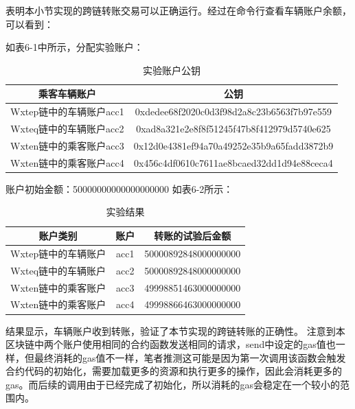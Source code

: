 表明本小节实现的跨链转账交易可以正确运行。经过在命令行查看车辆账户余额，可以看到：

如表6-1中所示，分配实验账户：

\begin{table}[H]
    \linespread{1.5}
    \centering
    \caption{实验账户公钥}\label{实验账户公钥}
    \begin{tabular}{cc} \toprule
        乘客车辆账户                  & 公钥                         \\ \hline
        Wxtep链中的车辆账户acc1 & 0xdedee68f2020c0d3f98d2a8c23b6563f7b97e559            \\
        Wxteq链中的车辆账户acc2   & 0xad8a321e2e8f8f51245f47b8f412979d5740e625            \\
        Wxten链中的乘客账户acc3   & 0x12d0e4381ef94a70a49252e35b9a65fadd3872b9 
        \\
        Wxten链中的乘客账户acc4   & 0x456c4df0610c7611ae8bcaed32dd1d94e88ceca4
        \\\bottomrule
    \end{tabular}
\end{table}

账户初始金额：50000000000000000000
如表6-2所示：

\begin{table}[H]
    \linespread{1.5}
    \centering
    \caption{实验结果}\label{实验结果}
    \begin{tabular}{ccc} \toprule
        账户类别                & 账户                 & 转账的试验后金额           \\ \hline
        Wxtep链中的车辆账户 & acc1   & 50000892848000000000                \\
        Wxteq链中的车辆账户 & acc2   & 50000892848000000000                \\
        Wxten链中的乘客账户 & acc3   & 49998851463000000000 
        \\
        Wxten链中的乘客账户 & acc4   & 49998866463000000000
        \\\bottomrule
    \end{tabular}
\end{table}

结果显示，车辆账户收到转账，验证了本节实现的跨链转账的正确性。
注意到本区块链中两个账户使用相同的合约函数发送相同的请求，send中设定的gas值也一样，但最终消耗的gas值不一样，笔者推测这可能是因为第一次调用该函数会触发合约代码的初始化，需要加载更多的资源和执行更多的操作，因此会消耗更多的gas。而后续的调用由于已经完成了初始化，所以消耗的gas会稳定在一个较小的范围内。


